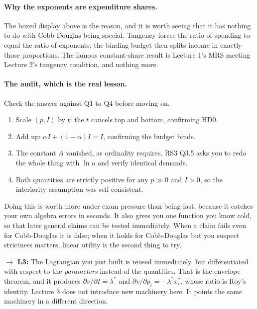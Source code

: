 \documentclass[11pt]{article}
\theoremstyle{definition}
\newenvironment{keybox}{\begin{snugshade}\noindent\ignorespaces}{\end{snugshade}}
\newcommand{\fwd}[1]{\textbf{\small $\rightarrow$ L3:} \small #1}
\begin{document}
\paragraph{Why the exponents are expenditure shares.} The boxed display above is the reason,
and it is worth seeing that it has nothing to do with Cobb-Douglas being special. Tangency
forces the ratio of spending to equal the ratio of exponents; the binding budget then splits
income in exactly those proportions. The famous constant-share result is Lecture 1's MRS
meeting Lecture 2's tangency condition, and nothing more.

\paragraph{The audit, which is the real lesson.} Check the answer against Q1 to Q4 before
moving on.

\begin{enumerate}
\item Scale $(p,I)$ by $t$: the $t$ cancels top and bottom, confirming HD0.
\item Add up: $\alpha I+(1-\alpha)I=I$, confirming the budget binds.
\item The constant $A$ vanished, as ordinality requires. RS3 Q3.5 asks you to redo the whole
thing with $\ln u$ and verify identical demands.
\item Both quantities are strictly positive for any $p\gg0$ and $I>0$, so the interiority
assumption was self-consistent.
\end{enumerate}

Doing this is worth more under exam pressure than being fast, because it catches your own
algebra errors in seconds. It also gives you one function you know cold, so that later
general claims can be tested immediately. When a claim fails even for Cobb-Douglas it is
false; when it holds for Cobb-Douglas but you suspect strictness matters, linear utility is
the second thing to try.

\begin{keybox}
\fwd{The Lagrangian you just built is reused immediately, but differentiated with respect to
the \emph{parameters} instead of the quantities. That is the envelope theorem, and it
produces $\partial v/\partial I=\lambda^*$ and $\partial v/\partial p_i=-\lambda^*x_i^*$,
whose ratio is Roy's identity. Lecture 3 does not introduce new machinery here. It points
the same machinery in a different direction.}
\end{keybox}
\end{document}
